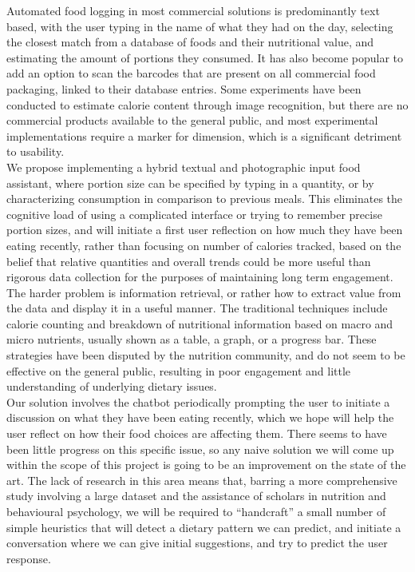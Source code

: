 \documentclass{scrartcl}
\begin{document}
Automated food logging in most commercial solutions is predominantly text based, with the user typing in the name of what they had on the day, selecting the closest match from a database of foods and their nutritional value, and estimating the amount of portions they consumed. It has also become popular to add an option to scan the barcodes that are present on all commercial food packaging, linked to their database entries. Some experiments have been conducted to estimate calorie content through image recognition, but there are no commercial products available to the general public, and most experimental implementations require a marker for dimension, which is a significant detriment to usability. \\

We propose implementing a hybrid textual and photographic input food assistant, where portion size can be specified by typing in a quantity, or by characterizing consumption in comparison to previous meals. This eliminates the cognitive load of using a complicated interface or trying to remember precise portion sizes, and will initiate a first user reflection on how much they have been eating recently, rather than focusing on number of calories tracked, based on the belief that relative quantities and overall trends could be more useful than rigorous data collection for the purposes of maintaining long term engagement. \\

The harder problem is information retrieval, or rather how to extract value from the data and display it in a useful manner. The traditional techniques include calorie counting and breakdown of nutritional information based on macro and micro nutrients, usually shown as a table, a graph, or a progress bar. These strategies have been disputed by the nutrition community, and do not seem to be effective on the general public, resulting in poor engagement and little understanding of underlying dietary issues. \\

Our solution involves the chatbot periodically prompting the user to initiate a discussion on what they have been eating recently, which we hope will help the user reflect on how their food choices are affecting them. There seems to have been little progress on this specific issue, so any naive solution we will come up within the scope of this project is going to be an improvement on the state of the art. The lack of research in this area means that, barring a more comprehensive study involving a large dataset and the assistance of scholars in nutrition and behavioural psychology, we will be required to “handcraft” a small number of simple heuristics that will detect a dietary pattern we can predict, and initiate a conversation where we can give initial suggestions, and try to predict the user response. \\
\end{document}
